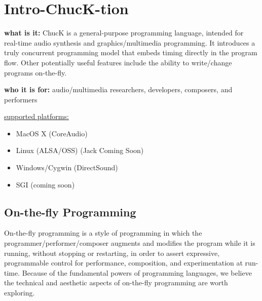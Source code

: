 \chapter{Intro-ChucK-tion} 

{\bf what is it:} ChucK is a general-purpose programming language, intended for 
real-time audio synthesis and graphics/multimedia programming.  It 
introduces a truly concurrent programming model that embeds timing 
directly in the program flow.  Other potentially useful features include 
the ability to write/change programs on-the-fly.

{\bf who it is for:} audio/multimedia researchers, developers, composers, and performers

\underline{supported platforms:}
\begin{itemize}
 \item MacOS X (CoreAudio)
 \item Linux (ALSA/OSS) (Jack Coming Soon)
 \item Windows/Cygwin (DirectSound)
 \item SGI (coming soon)
\end{itemize}

\section*{On-the-fly Programming}
On-the-fly programming is a style of programming in which the programmer/performer/composer 
augments and modifies the program while it is running, without stopping or restarting, 
in order to assert expressive, programmable control for performance, composition, and 
experimentation at run-time. Because of the fundamental powers of programming languages, 
we believe the technical and aesthetic aspects of on-the-fly programming are worth exploring.